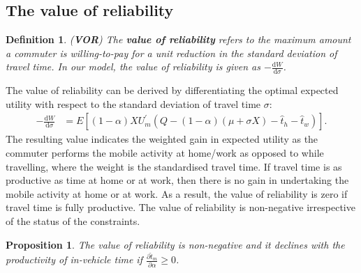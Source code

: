 \documentclass[12pt,a4paper,british]{article}
\newtheorem{definition}{Definition}[section]
\newtheorem{prop}{Proposition}[section]
\begin{document}
\subsection*{The value of reliability }
\begin{definition}
(\textbf{VOR}) The \textbf{\textit{value of reliability}} refers to the maximum amount a commuter is willing-to-pay for a unit reduction in the standard deviation of travel time. In our model, the value of reliability is given as $-\frac{\mathrm{d}W}{\mathrm{d}\sigma}$.
\end{definition}
The value of reliability can be derived by differentiating the optimal expected utility with respect to the standard deviation of travel time $\sigma$: 
\begin{align*}
-\frac{\mathrm{d}W}{\mathrm{d}\sigma} & =E\left[\left( 1 - \alpha \right) X U_{m}^{\prime} \left(Q - \left(1 - \alpha\right) \left(\mu + \sigma X \right) - \hat{t}_{h} - \hat{t}_{w}\right)\right].
\end{align*}
The resulting value indicates the weighted gain in expected utility as the commuter performs the mobile activity at home/work as opposed to while travelling, where the weight is the standardised travel time. If travel time is as productive as time at home or at work, then there is no gain in undertaking the mobile activity at home or at work. As a result, the value of reliability is zero if travel time is fully productive. The value of reliability is non-negative irrespective of the status of the constraints.

\begin{prop}
The value of reliability is non-negative and it declines with the productivity of in-vehicle time if $\frac{\partial\hat{t}_{m}}{\partial\alpha}\geq0$. 
\end{prop}
\end{document}
